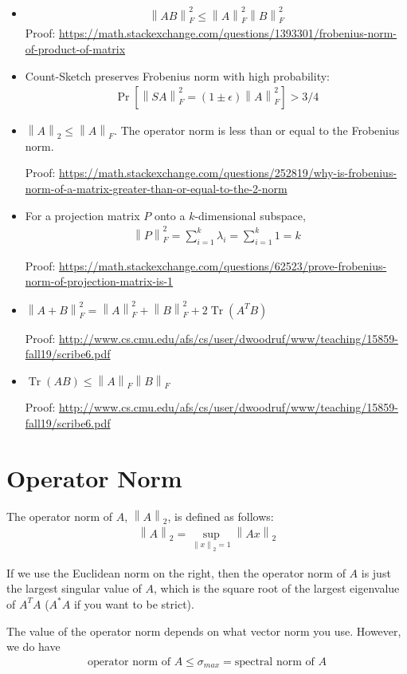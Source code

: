 \documentclass[11pt]{article}
\newcommand{\eq}[1]{\begin{align*}#1\end{align*}}
\newcommand{\norm}[1]{\left\lVert#1\right\rVert}
\DeclareMathOperator{\Tr}{Tr}
\begin{document}
\begin{itemize}
\item
\eq{
\norm{AB}_F^2 \leq \norm{A}_F^2 \norm{B}_F^2
}
Proof: \url{https://math.stackexchange.com/questions/1393301/frobenius-norm-of-product-of-matrix}

\item Count-Sketch preserves Frobenius norm with high probability:
\eq{
\Pr[\norm{SA}_F^2 = (1 \pm \epsilon) \norm{A}_F^2] > 3/4
}

\item $\norm{A}_2 \leq \norm{A}_F$. The operator norm is less than or equal to the Frobenius norm.

Proof: \url{https://math.stackexchange.com/questions/252819/why-is-frobenius-norm-of-a-matrix-greater-than-or-equal-to-the-2-norm}

\item For a projection matrix $P$ onto a $k$-dimensional subspace,
\eq{
\norm{P}_F^2 = \sum_{i=1}^k \lambda_i = \sum_{i=1}^k 1 = k
}

Proof: \url{https://math.stackexchange.com/questions/62523/prove-frobenius-norm-of-projection-matrix-is-1}

\item $\norm{A + B}_F^2 = \norm{A}_F^2 + \norm{B}_F^2 + 2 \Tr(A^T B)$

Proof: \url{http://www.cs.cmu.edu/afs/cs/user/dwoodruf/www/teaching/15859-fall19/scribe6.pdf}

\item $\Tr(AB) \leq \norm{A}_F \norm{B}_F$

Proof: \url{http://www.cs.cmu.edu/afs/cs/user/dwoodruf/www/teaching/15859-fall19/scribe6.pdf}

\end{itemize}

\section{Operator Norm}
The operator norm of $A$, $\norm{A}_2$, is defined as follows:
\eq{
\norm{A}_2 = \sup_{\norm{x}_2=1} \norm{Ax}_2
}

If we use the Euclidean norm on the right, then the operator norm of $A$ is just the largest singular value of $A$, which is the square root of the largest eigenvalue of $A^T A$ ($A^* A$ if you want to be strict).

The value of the operator norm depends on what vector norm you use. However, we do have
\eq{
\text{operator norm of $A$} \leq \sigma_{max} = \text{spectral norm of $A$}
}
\end{document}
